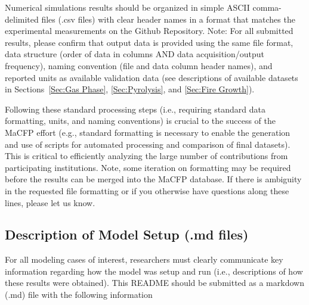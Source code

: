 \documentclass[12pt]{article}
\begin{document}
Numerical simulations results should be organized in simple ASCII comma-delimited files (.csv files) with clear header names in a format that matches the experimental measurements on the Github Repository. 
Note: For all submitted results, please confirm that output data is provided using the same file format, data structure (order of data in columns AND data acquisition/output frequency), naming convention (file and data column header names), and reported units as available validation data (see descriptions of available datasets in Sections~\ref{Sec:Gas Phase}, \ref{Sec:Pyrolysis}, and \ref{Sec:Fire Growth}). 

Following these standard processing steps (i.e., requiring standard data formatting, units, and naming conventions) is crucial to the success of the MaCFP effort (e.g., standard formatting is necessary to enable the generation and use of scripts for automated processing and comparison of final datasets). This is critical to efficiently analyzing the large number of contributions from participating institutions. Note, some iteration on formatting may be required before the results can be merged into the MaCFP database. If there is ambiguity in the requested file formatting or if you otherwise have questions along these lines, please let us know.

\subsection{Description of Model Setup (.md files)}
For all modeling cases of interest, researchers must clearly communicate key information regarding how the model was setup and run (i.e., descriptions of how these results were obtained). This README should be submitted as a markdown (.md) file with the following information
\end{document}
